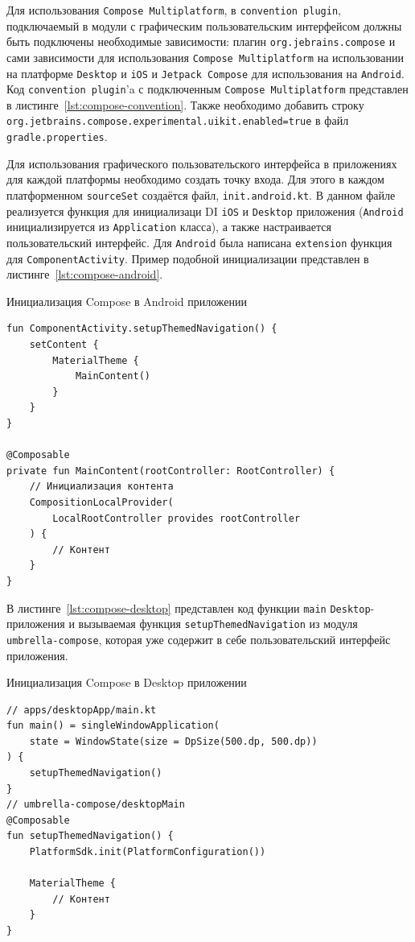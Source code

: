 \documentclass[14pt, russian]{scrartcl}
\begin{document}
Для использования \texttt{Compose Multiplatform}, в \texttt{convention plugin}, подключаемый в модули с графическим пользовательским интерфейсом должны быть подключены необходимые зависимости: плагин \texttt{org.jebrains.compose} и сами зависимости для использования \texttt{Compose Multiplatform} на использовании на платформе \texttt{Desktop} и \texttt{iOS} и \texttt{Jetpack Compose} для использования на \texttt{Android}. Код \texttt{convention plugin}'a с подключенным \texttt{Compose Multiplatform} представлен в листинге~\ref{lst:compose-convention}. Также необходимо добавить строку \texttt{org.jetbrains.compose.experimental.uikit.enabled=true} в файл \texttt{gradle.properties}.

Для использования графического пользовательского интерфейса в приложениях для каждой платформы необходимо создать точку входа. Для этого в каждом платформенном \texttt{sourceSet} создаётся файл, \texttt{init.android.kt}. В данном файле реализуется функция для инициализаци DI \texttt{iOS} и \texttt{Desktop} приложения (\texttt{Android} инициализируется из \texttt{Application} класса), а также настраивается пользовательский интерфейс. Для \texttt{Android} была написана \texttt{extension} функция для \texttt{ComponentActivity}. Пример подобной инициализации представлен в листинге~\ref{lst:compose-android}.

\begin{listing}[!htb]
\caption{Инициализация Compose в Android приложении}
\label{lst:compose-android}
\begin{verbatim}
fun ComponentActivity.setupThemedNavigation() {
    setContent {
        MaterialTheme {
            MainContent()
        }
    }
}

@Composable
private fun MainContent(rootController: RootController) {
    // Инициализация контента
    CompositionLocalProvider(
        LocalRootController provides rootController
    ) {
        // Контент
    }
}
\end{verbatim}
\end{listing}

В листинге~\ref{lst:compose-desktop} представлен код функции \texttt{main} \texttt{Desktop}-приложения и вызываемая функция \texttt{setupThemedNavigation} из модуля \texttt{umbrella-compose}, которая уже содержит в себе пользовательский интерфейс приложения.

\begin{listing}[!htb]
\caption{Инициализация Compose в Desktop приложении}
\label{lst:compose-desktop}
\begin{verbatim}
// apps/desktopApp/main.kt
fun main() = singleWindowApplication(
    state = WindowState(size = DpSize(500.dp, 500.dp))
) {
    setupThemedNavigation()
}
// umbrella-compose/desktopMain
@Composable
fun setupThemedNavigation() {
    PlatformSdk.init(PlatformConfiguration())

    MaterialTheme {
        // Контент
    }
}
\end{verbatim}
\end{listing}
\end{document}
